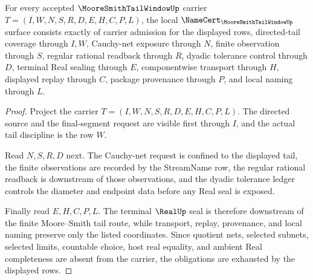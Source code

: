 \begin{theorem}
\label{thm:moore-smith-tail-window-namecert-obligations}
For every accepted $\MooreSmithTailWindowUp$ carrier $T=(I,W,N,S,R,D,E,H,C,P,L)$, the local $\NameCert_{\MooreSmithTailWindowUp}$ surface consists exactly of carrier admission for the displayed rows, directed-tail coverage through $I,W$, Cauchy-net exposure through $N$, finite observation through $S$, regular rational readback through $R$, dyadic tolerance control through $D$, terminal Real sealing through $E$, componentwise transport through $H$, displayed replay through $C$, package provenance through $P$, and local naming through $L$.
\end{theorem}
\begin{proof}
Project the carrier $T=(I,W,N,S,R,D,E,H,C,P,L)$. The directed source and the final-segment request are visible first through $I$, and the actual tail discipline is the row $W$.

Read $N,S,R,D$ next. The Cauchy-net request is confined to the displayed tail, the finite observations are recorded by the StreamName row, the regular rational readback is downstream of those observations, and the dyadic tolerance ledger controls the diameter and endpoint data before any Real seal is exposed.

Finally read $E,H,C,P,L$. The terminal $\RealUp$ seal is therefore downstream of the finite Moore--Smith tail route, while transport, replay, provenance, and local naming preserve only the listed coordinates. Since quotient nets, selected subnets, selected limits, countable choice, host real equality, and ambient Real completeness are absent from the carrier, the obligations are exhausted by the displayed rows.
\end{proof}

